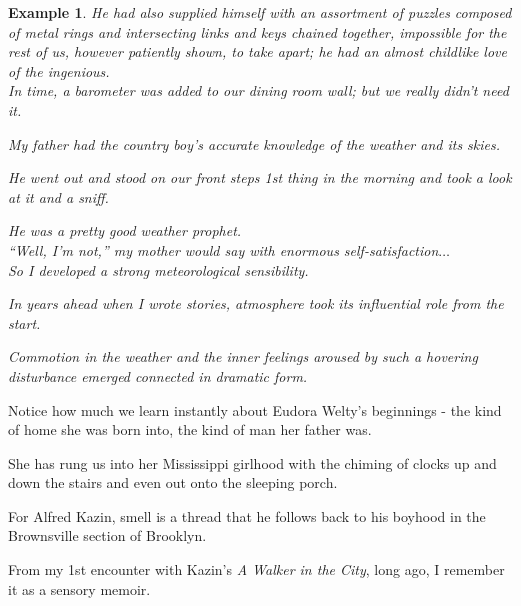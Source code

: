 \documentclass{book}
\numberwithin{equation}{section}
\newtheorem{example}{Example}[chapter]
\begin{document}
\begin{example}
    He had also supplied himself with an assortment of puzzles composed of metal rings and intersecting links and keys chained together, impossible for the rest of us, however patiently shown, to take apart; he had an almost childlike love of the ingenious.
    \\
    
    In time, a barometer was added to our dining room wall; but we really didn't need it.
    
    My father had the country boy's accurate knowledge of the weather and its skies.
    
    He went out and stood on our front steps 1st thing in the morning and took a look at it and a sniff.
    
    He was a pretty good weather prophet.
    \\
    
    ``Well, I'm \textit{not},'' my mother would say with enormous self-satisfaction$\ldots$
    \\
    
    So I developed a strong meteorological sensibility.
    
    In years ahead when I wrote stories, atmosphere took its influential role from the start.
    
    Commotion in the weather and the inner feelings aroused by such a hovering disturbance emerged connected in dramatic form.
\end{example}
Notice how much we learn instantly about Eudora Welty's beginnings - the kind of home she was born into, the kind of man her father was.

She has rung us into her Mississippi girlhood with the chiming of clocks up and down the stairs and even out onto the sleeping porch.

%
For Alfred Kazin, smell is a thread that he follows back to his boyhood in the Brownsville section of Brooklyn.

From my 1st encounter with Kazin's \textit{A Walker in the City}, long ago, I remember it as a sensory memoir.
\end{document}
